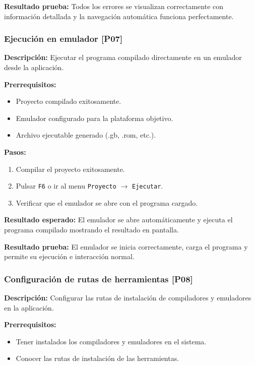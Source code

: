 \documentclass[../../main.tex]{subfiles}
\begin{document}
\textbf{Resultado prueba:} Todos los errores se visualizan correctamente con información detallada y la navegación automática funciona perfectamente.

\subsubsection{Ejecución en emulador [P07]}

\textbf{Descripción:} Ejecutar el programa compilado directamente en un emulador desde la aplicación.

\textbf{Prerrequisitos:} 
\begin{itemize}
\item Proyecto compilado exitosamente.
\item Emulador configurado para la plataforma objetivo.
\item Archivo ejecutable generado (.gb, .rom, etc.).
\end{itemize}

\textbf{Pasos:}
\begin{enumerate}
\item Compilar el proyecto exitosamente.
\item Pulsar \lstinline|F6| o ir al menu \lstinline|Proyecto| $\rightarrow$ \lstinline|Ejecutar|.
\item Verificar que el emulador se abre con el programa cargado.
\end{enumerate}

\textbf{Resultado esperado:} El emulador se abre automáticamente y ejecuta el programa compilado mostrando el resultado en pantalla.

\textbf{Resultado prueba:} El emulador se inicia correctamente, carga el programa y permite su ejecución e interacción normal.


\subsubsection{Configuración de rutas de herramientas [P08]}

\textbf{Descripción:} Configurar las rutas de instalación de compiladores y emuladores en la aplicación.

\textbf{Prerrequisitos:} 
\begin{itemize}
\item Tener instalados los compiladores y emuladores en el sistema.
\item Conocer las rutas de instalación de las herramientas.
\end{itemize}
\end{document}
